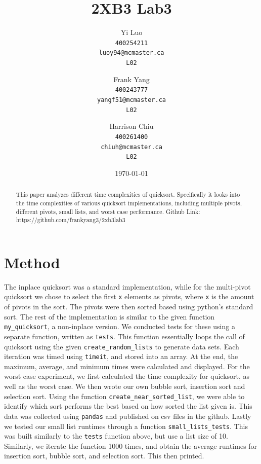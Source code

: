 \documentclass{article}
\title{2XB3 Lab3}
\author{
  Yi Luo\\
  \texttt{400254211}\\
  \texttt{luoy94@mcmaster.ca}\\
  \texttt{L02}
  \and
  Frank Yang\\
  \texttt{400243777}\\
  \texttt{yangf51@mcmaster.ca}\\
  \texttt{L02}
  \and
  Harrison Chiu\\
  \texttt{400261400}\\
  \texttt{chiuh@mcmaster.ca}\\
  \texttt{L02}
}
\date{\today}
\begin{document}
\maketitle

\begin{abstract}
This paper analyzes different time complexities of quicksort. Specifically it looks into the time complexities of various quicksort implementations, including multiple pivots, different pivots, small lists, and worst case performance. Github Link: https://github.com/frankyang3/2xb3lab3
\end{abstract}

\section*{Method}
 The inplace quicksort was a standard implementation, while for the multi-pivot quicksort we chose to select the first \verb|x| elements as pivots, where \verb|x| is the amount of pivots in the sort. The pivots were then sorted based using python's standard sort. The rest of the implementation is similar to the given function \verb|my_quicksort|, a non-inplace version. We conducted tests for these using a separate function, written as \verb|tests|. This function essentially loops the call of quicksort using the given \verb|create_random_lists| to generate data sets. Each iteration was timed using \verb|timeit|, and stored into an array. At the end, the maximum, average, and minimum times were calculated and displayed. For the worst case experiment, we first calculated the time complexity for quicksort, as well as the worst case. We then wrote our own bubble sort, insertion sort and selection sort. Using the function \verb|create_near_sorted_list|, we were able to identify which sort performs the best based on how sorted the list given is. This data was collected using \verb|pandas| and published on csv files in the github. Lastly we tested our small list runtimes through a function \verb|small_lists_tests|. This was built similarly to the \verb|tests| function above, but use a list size of 10. Similarly, we iterate the function 1000 times, and obtain the average runtimes for insertion sort, bubble sort, and selection sort. This then printed.
\end{document}
